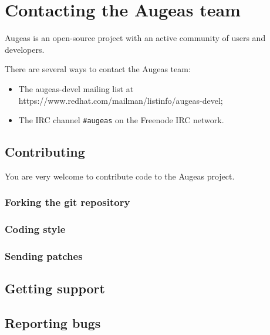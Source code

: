 \chapter{Contacting the Augeas team}


Augeas is an open-source project with an active community of users and developers.

There are several ways to contact the Augeas team:

\begin{itemize}
\item
  The augeas-devel mailing list at https://www.redhat.com/mailman/listinfo/augeas-devel;
\item
  The IRC channel \verb!#augeas! on the Freenode IRC network.
\end{itemize}


\section{Contributing}

You are very welcome to contribute code to the Augeas project.

\subsection{Forking the git repository}

\subsection{Coding style}

\subsection{Sending patches}

\section{Getting support}

\section{Reporting bugs}


